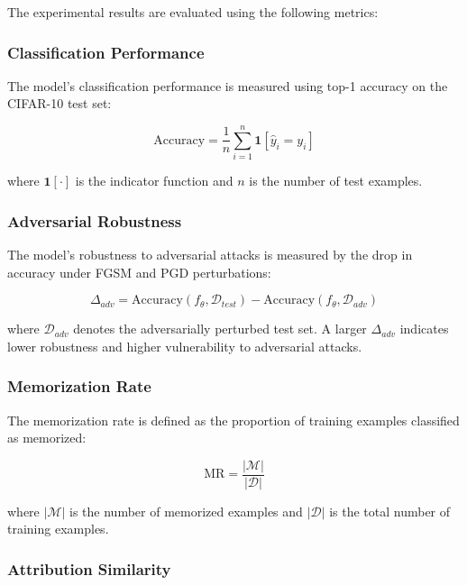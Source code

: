 The experimental results are evaluated using 
the following metrics:

\subsubsection{Classification Performance}

The model's classification performance is 
measured using top-1 accuracy on the CIFAR-10 
test set:

\begin{equation}
\text{Accuracy} = \frac{1}{n} \sum_{i=1}^{n} 
\mathbf{1}[\hat{y}_i = y_i]
\label{eq:accuracy}
\end{equation}

where $\mathbf{1}[\cdot]$ is the indicator 
function and $n$ is the number of test examples.

\subsubsection{Adversarial Robustness}

The model's robustness to adversarial attacks 
is measured by the drop in accuracy under 
FGSM and PGD perturbations:

\begin{equation}
\Delta_{adv} = \text{Accuracy}(f_\theta, 
\mathcal{D}_{test}) - \text{Accuracy}
(f_\theta, \mathcal{D}_{adv})
\label{eq:advdrop}
\end{equation}

where $\mathcal{D}_{adv}$ denotes the 
adversarially perturbed test set. A larger 
$\Delta_{adv}$ indicates lower robustness 
and higher vulnerability to adversarial attacks.

\subsubsection{Memorization Rate}

The memorization rate is defined as the 
proportion of training examples classified 
as memorized:

\begin{equation}
\text{MR} = \frac{|\mathcal{M}|}{|\mathcal{D}|}
\label{eq:memrate}
\end{equation}

where $|\mathcal{M}|$ is the number of memorized 
examples and $|\mathcal{D}|$ is the total number 
of training examples.

\subsubsection{Attribution Similarity}

